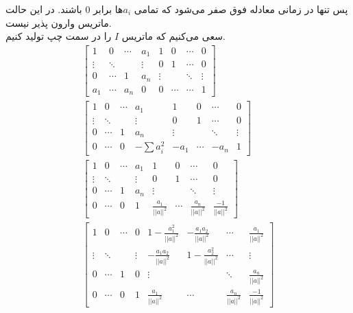 پس تنها در زمانی معادله فوق صفر می‌شود که تمامی
$a_i$ها
برابر 0 باشند. در این حالت ماتریس وارون پذیر نیست.
\\
سعی می‌کنیم که ماتریس
$I$
را در سمت چپ تولید کنیم.
\begin{gather*}
    \left[
        \begin{array}{cccc|cccc}
            1 & 0 & \cdots & a_1 & 1 & 0 & \cdots & 0\\
            \vdots & \ddots &  & \vdots & 0 & 1 & \cdots & 0\\
            0 & \cdots & 1 & a_n & \vdots &  & \ddots & \vdots\\
            a_1 & \cdots & a_n & 0 & 0 & \cdots & \cdots & 1
        \end{array}
    \right]
    \\
    \left[
        \begin{array}{cccc|cccc}
            1 & 0 & \cdots & a_1 & 1 & 0 & \cdots & 0\\
            \vdots & \ddots &  & \vdots & 0 & 1 & \cdots & 0\\
            0 & \cdots & 1 & a_n & \vdots &  & \ddots & \vdots\\
            0 & \cdots & 0 & -\sum a_i^2 & -a_1 & \cdots & -a_n & 1 
        \end{array}
    \right]
    \\
    \left[
        \begin{array}{cccc|cccc}
            1 & 0 & \cdots & a_1 & 1 & 0 & \cdots & 0\\
            \vdots & \ddots &  & \vdots & 0 & 1 & \cdots & 0\\
            0 & \cdots & 1 & a_n & \vdots &  & \ddots & \vdots\\
            0 & \cdots & 0 & 1 & \frac{a_1}{||a||^2} & \cdots & \frac{a_n}{||a||^2} & \frac{-1}{||a||^2} 
        \end{array}
    \right]
    \\
    \left[
        \begin{array}{cccc|cccc}
            1 & 0 & \cdots & 0 & 1 -\frac{a_1^2}{||a||^2} & -\frac{a_1 a_2}{||a||^2} & \cdots & \frac{a_1}{||a||^2}\\
            \vdots & \ddots &  & \vdots & -\frac{a_1 a_2}{||a||^2} & 1 -\frac{a_2^2}{||a||^2} & \cdots & \vdots\\
            0 & \cdots & 1 & 0 & \vdots &  & \ddots & \frac{a_n}{||a||^2}\\
            0 & \cdots & 0 & 1 & \frac{a_1}{||a||^2} & \cdots & \frac{a_n}{||a||^2} & \frac{-1}{||a||^2} 
        \end{array}
    \right]
\end{gather*}



